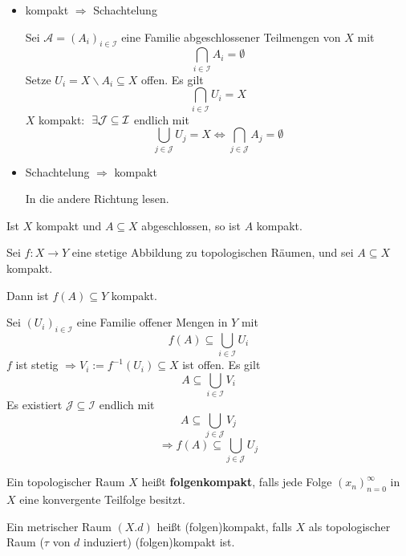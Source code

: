 \documentclass[main.tex]{subfiles}
\begin{document}
\begin{Beweis}
  \begin{itemize}
    \item kompakt $\Rightarrow$ Schachtelung

      Sei $\mathcal{A} = (A_i)_{i \in \mathcal{I}}$ eine Familie abgeschlossener Teilmengen von $X$ mit
      $$\bigcap_{i \in \mathcal{I}} A_i = \emptyset$$
      Setze $U_i = X \backslash A_i \subseteq X$ offen. Es gilt
      $$\bigcap_{i \in \mathcal{I}} U_i = X$$
      $X$ kompakt: $\;\exists \mathcal{J} \subseteq \mathcal{I}$ endlich mit
      $$\bigcup_{j \in \mathcal{J}} U_j = X \Leftrightarrow \bigcap_{j \in \mathcal{J}} A_j = \emptyset$$
    \item Schachtelung $\Rightarrow$ kompakt

      In die andere Richtung lesen.
  \end{itemize}
\end{Beweis}

\begin{Korollar}
  Ist $X$ kompakt und $A \subseteq X$ abgeschlossen, so ist $A$ kompakt.
\end{Korollar}

\begin{Theorem}
  Sei $f: X \to Y$ eine stetige Abbildung zu topologischen Räumen, und sei $A \subseteq X$ kompakt.

  Dann ist $f(A) \subseteq Y$ kompakt.
\end{Theorem}

\begin{Beweis}
  Sei $(U_i)_{i \in \mathcal{I}}$ eine Familie offener Mengen in $Y$ mit
  $$f(A) \subseteq \bigcup_{i \in \mathcal{I}} U_i$$
  $f$ ist stetig $\Rightarrow V_i := f^{-1}(U_i) \subseteq X$ ist offen. Es gilt
  $$A \subseteq \bigcup_{i \in \mathcal{I}} V_i$$
  Es existiert $\mathcal{J} \subseteq \mathcal{I}$ endlich mit
  $$A \subseteq \bigcup_{j \in \mathcal{J}} V_j$$
  $$\Rightarrow f(A) \subseteq \bigcup_{j \in \mathcal{J}} U_j$$
\end{Beweis}


\begin{Definition}[Folgenkompaktheit]
  Ein topologischer Raum $X$ heißt \textbf{folgenkompakt}, falls jede Folge $(x_n)_{n=0}^\infty$ in $X$ eine konvergente Teilfolge besitzt.

  Ein metrischer Raum $(X.d)$ heißt (folgen)kompakt, falls $X$ als topologischer Raum ($\tau$ von $d$ induziert) (folgen)kompakt ist.
\end{Definition}
\end{document}

